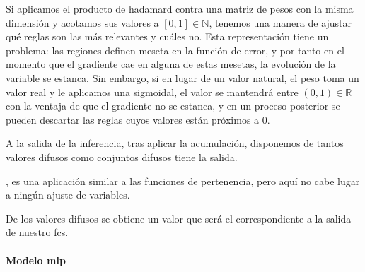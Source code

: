 Si aplicamos el producto de hadamard contra una matriz de pesos con la misma dimensión y acotamos sus valores a $[0, 1] \in \mathbb{N}$, tenemos una manera de ajustar qué reglas son las más relevantes y cuáles no. Esta representación tiene un problema: las regiones definen meseta en la función de error, y por tanto en el momento que el gradiente cae en alguna de estas mesetas, la evolución de la variable se estanca. Sin embargo, si en lugar de un valor natural, el peso toma un valor real y le aplicamos una sigmoidal, el valor se mantendrá entre $(0, 1) \in \mathbb{R}$ con la ventaja de que el gradiente no se estanca, y en un proceso posterior se pueden descartar las reglas cuyos valores están próximos a $0$.

A la salida de la inferencia, tras aplicar la acumulación, disponemos de tantos valores difusos como conjuntos difusos tiene la salida.

, es una aplicación similar a las funciones de pertenencia, pero aquí no cabe lugar a ningún ajuste de variables.

De los valores difusos se obtiene un valor que será el correspondiente a la salida de nuestro \ac{fcs}.

\newthought{}
 




\paragraph{Modelo \ac{mlp}}


